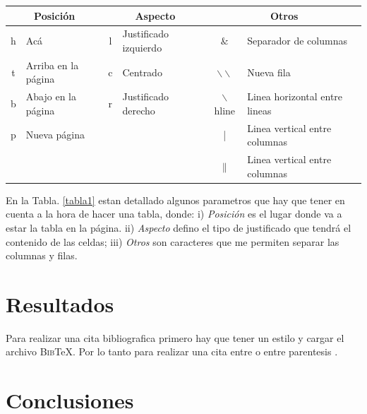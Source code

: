 \documentclass[a4paper,12pt]{article} %
\begin{document}
\begin{table}[h] %
 \centering
 {\scriptsize %
 \begin{tabular}{||c|l|c|l|c|l||} %
  \hline
  \multicolumn{2}{||c|}{Posición} & \multicolumn{2}{c|}{Aspecto} & \multicolumn{2}{c||}{Otros} \\ \hline
  h    & Acá 		                 & l & Justificado izquierdo & $\&$                    & Separador de columnas \\ \hline
  t    & Arriba en la página             & c & Centrado              & $\backslash \backslash$ &  Nueva fila \\ \hline
  b    & Abajo en la página              & r & Justificado derecho   & $\backslash$hline       & Linea horizontal entre lineas \\ \hline
  p    & Nueva página        		 &   &                       & |                       & Linea vertical entre columnas \\ \hline
       &                                 &   &                       & $\|$                    & Linea vertical entre columnas \\ \hline
 \end{tabular}
 }
 \label{tabla2}
\end{table}

En la Tabla. \ref{tabla1} estan detallado algunos parametros que hay que tener en cuenta a la hora de hacer una tabla, donde: i) \textit{Posición} es el lugar donde va a estar la tabla en la página. ii) \textit{Aspecto} defino el tipo de justificado que tendrá el contenido de las celdas; iii) \textit{Otros} son caracteres que me permiten separar las columnas y filas.

\section{Resultados}
Para realizar una cita bibliografica primero hay que tener un estilo y cargar el archivo \textsc{Bib}\TeX{}. Por lo tanto para realizar una cita entre \citet{Blakely1996} o entre parentesis \citep{Blakely1996}.

\section{Conclusiones}


\newpage


\tableofcontents{}


\end{document}
